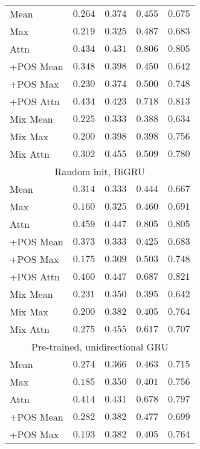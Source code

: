 \begin{table}
\begin{tabular}{lrrrr}
    Mean & $0.264$ & $0.374$ & $0.455$ & $0.675$ \\
    Max & $0.219$ & $0.325$ & $0.487$ & $0.683$ \\
    Attn & $0.434$ & $0.431$ & $\mathbf{0.806}$ & $0.805$ \\
    +POS Mean & $0.348$ & $0.398$ & $0.450$ & $0.642$ \\
    +POS Max & $0.230$ & $0.374$ & $0.500$ & $0.748$ \\
    +POS Attn & $0.434$ & $0.423$ & $0.718$ & $0.813$ \\
    Mix Mean & $0.225$ & $0.333$ & $0.388$ & $0.634$ \\
    Mix Max & $0.200$ & $0.398$ & $0.398$ & $0.756$ \\
    Mix Attn & $0.302$ & $\mathbf{0.455}$ & $0.509$ & $0.780$ \\
    \midrule \multicolumn{5}{c}{Random init, BiGRU} \\ \midrule
    Mean & $0.314$ & $0.333$ & $0.444$ & $0.667$ \\
    Max & $0.160$ & $0.325$ & $0.460$ & $0.691$ \\
    Attn & $0.459$ & $0.447$ & $0.805$ & $0.805$ \\
    +POS Mean & $0.373$ & $0.333$ & $0.425$ & $0.683$ \\
    +POS Max & $0.175$ & $0.309$ & $0.503$ & $0.748$ \\
    +POS Attn & $\mathbf{0.460}$ & $0.447$ & $0.687$ & $\mathbf{0.821}$ \\
    Mix Mean & $0.231$ & $0.350$ & $0.395$ & $0.642$ \\
    Mix Max & $0.200$ & $0.382$ & $0.405$ & $0.764$ \\
    Mix Attn & $0.275$ & $\mathbf{0.455}$ & $0.617$ & $0.707$ \\
    \midrule \multicolumn{5}{c}{Pre-trained, unidirectional GRU} \\ \midrule
    Mean & $0.274$ & $0.366$ & $0.463$ & $0.715$ \\
    Max & $0.185$ & $0.350$ & $0.401$ & $0.756$ \\
    Attn & $0.414$ & $0.431$ & $0.678$ & $0.797$ \\
    +POS Mean & $0.282$ & $0.382$ & $0.477$ & $0.699$ \\
    +POS Max & $0.193$ & $0.382$ & $0.405$ & $0.764$ \\

\end{tabular}
\end{table}
